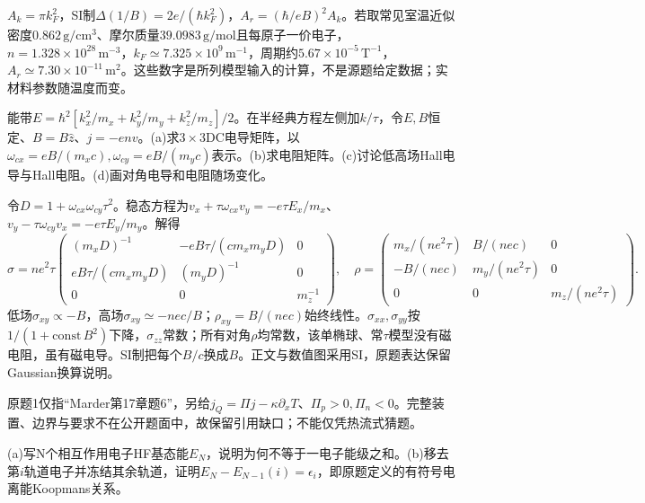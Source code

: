\begin{solution}
$A_k=\pi k_F^2$，SI制$\Delta(1/B)=2e/(\hbar k_F^2)$，$A_r=(\hbar/eB)^2A_k$。若取常见室温近似密度$0.862\,\mathrm{g/cm^3}$、摩尔质量$39.0983\,\mathrm{g/mol}$且每原子一价电子，$n=1.328\times10^{28}\,\mathrm{m^{-3}}$，$k_F\simeq7.325\times10^9\,\mathrm{m^{-1}}$，周期约$5.67\times10^{-5}\,\mathrm{T^{-1}}$，$A_r\simeq7.30\times10^{-11}\,\mathrm{m^2}$。这些数字是所列模型输入的计算，不是源题给定数据；实材料参数随温度而变。
\end{solution}
\begin{exercise}[原题2(a)--(d)]
能带$E=\hbar^2[k_x^2/m_x+k_y^2/m_y+k_z^2/m_z]/2$。在半经典方程左侧加$k/\tau$，令$E,B$恒定、$B=B\hat z$、$j=-env$。(a)求$3\times3$DC电导矩阵，以$\omega_{cx}=eB/(m_xc),\omega_{cy}=eB/(m_yc)$表示。(b)求电阻矩阵。(c)讨论低高场Hall电导与Hall电阻。(d)画对角电导和电阻随场变化。
\end{exercise}
\begin{solution}
令$D=1+\omega_{cx}\omega_{cy}\tau^2$。稳态方程为$v_x+\tau\omega_{cx}v_y=-e\tau E_x/m_x$、$v_y-\tau\omega_{cy}v_x=-e\tau E_y/m_y$。解得
\begin{equation}
\sigma=ne^2\tau\begin{pmatrix}(m_xD)^{-1}&-eB\tau/(cm_xm_yD)&0\\eB\tau/(cm_xm_yD)&(m_yD)^{-1}&0\\0&0&m_z^{-1}\end{pmatrix},\quad
\rho=\begin{pmatrix}m_x/(ne^2\tau)&B/(nec)&0\\-B/(nec)&m_y/(ne^2\tau)&0\\0&0&m_z/(ne^2\tau)\end{pmatrix}.
\end{equation}
低场$\sigma_{xy}\propto-B$，高场$\sigma_{xy}\simeq-nec/B$；$\rho_{xy}=B/(nec)$始终线性。$\sigma_{xx},\sigma_{yy}$按$1/(1+\mathrm{const}\,B^2)$下降，$\sigma_{zz}$常数；所有对角$\rho$均常数，该单椭球、常$\tau$模型没有磁电阻，虽有磁电导。SI制把每个$B/c$换成$B$。正文与数值图采用SI，原题表达保留Gaussian换算说明。
\end{solution}
原题1仅指“Marder第17章题6”，另给$ j_Q=\Pi j-\kappa\partial_xT$、$\Pi_p>0,\Pi_n<0$。完整装置、边界与要求不在公开题面中，故保留引用缺口；不能仅凭热流式猜题。
\begin{exercise}[原题2(a)--(b)]
(a)写N个相互作用电子HF基态能$E_N$，说明为何不等于一电子能级之和。(b)移去第$i$轨道电子并冻结其余轨道，证明$E_N-E_{N-1}(i)=\epsilon_i$，即原题定义的有符号电离能Koopmans关系。
\end{exercise}
